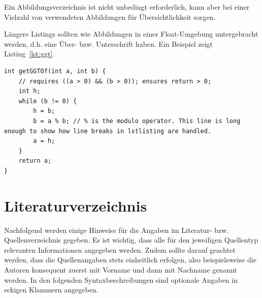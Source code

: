 \documentclass[
    fontsize=12pt,
    headings=small,
    parskip=half,           %
    bibliography=totoc,
    numbers=noenddot,       %
    open=any,               %
    ]{scrreprt}
\begin{document}
Ein Abbildungsverzeichnis ist nicht unbedingt erforderlich, kann aber bei einer Vielzahl von verwendeten Abbildungen für Übersichtlichkeit sorgen.

Längere Listings sollten wie Abbildungen in einer Float-Umgebung untergebracht werden, d.h. eine Über- bzw. Unterschrift haben. Ein Beispiel zeigt Listing~\ref{lst:ggt}.

\begin{lstlisting}[float,caption={Berechnung des größten gemeinsamen Teilers zweier ganzer Zahlen a und b},label={lst:ggt}]
int getGGTOf(int a, int b) {
    // requires ((a > 0) && (b > 0)); ensures return > 0;
    int h;
    while (b != 0) {
        h = b;
        b = a % b; // % is the modulo operator. This line is long enough to show how line breaks in lstlisting are handled.
        a = h;
    }
    return a;
}
\end{lstlisting}

\section{Literaturverzeichnis}
\label{sec:literaturhowto}

Nachfolgend werden einige Hinweise für die Angaben im Literatur- bzw. Quellenverzeichnis gegeben. Es ist wichtig, dass alle für den jeweiligen Quellentyp relevanten Informationen angegeben werden. Zudem sollte darauf geachtet werden, dass die Quellenangaben stets einheitlich erfolgen, also beispielsweise die Autoren konsequent zuerst mit Vorname und dann mit Nachname genannt werden. In den folgenden Syntaxbeschreibungen sind optionale Angaben in eckigen Klammern angegeben.
\end{document}
